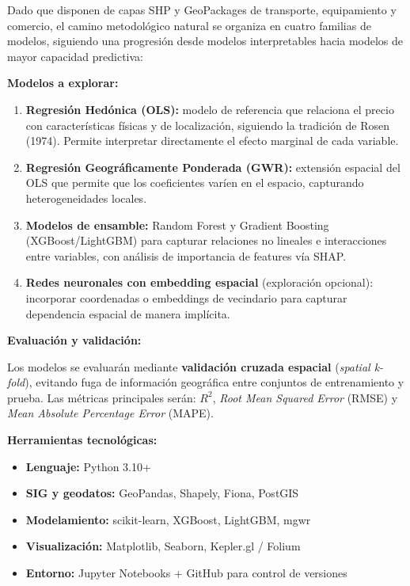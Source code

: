 \documentclass[12pt, letterpaper]{article}
\begin{document}
\begin{aimsg}
Dado que disponen de capas SHP y GeoPackages de transporte, equipamiento y comercio, el camino
metodológico natural se organiza en cuatro familias de modelos, siguiendo una progresión desde
modelos interpretables hacia modelos de mayor capacidad predictiva:

\medskip
\textbf{Modelos a explorar:}

\begin{enumerate}[leftmargin=1.5em, itemsep=0.4em]
  \item \textbf{Regresión Hedónica (OLS):} modelo de referencia que relaciona
        el precio con características físicas y de localización, siguiendo la
        tradición de Rosen (1974). Permite interpretar directamente el efecto
        marginal de cada variable.
  \item \textbf{Regresión Geográficamente Ponderada (GWR):} extensión espacial
        del OLS que permite que los coeficientes varíen en el espacio, capturando
        heterogeneidades locales.
  \item \textbf{Modelos de ensamble:} Random Forest y Gradient Boosting
        (XGBoost/LightGBM) para capturar relaciones no lineales e interacciones
        entre variables, con análisis de importancia de features vía SHAP.
  \item \textbf{Redes neuronales con embedding espacial} (exploración opcional):
        incorporar coordenadas o embeddings de vecindario para capturar dependencia
        espacial de manera implícita.
\end{enumerate}

\medskip
\textbf{Evaluación y validación:}

Los modelos se evaluarán mediante \textbf{validación cruzada espacial}
(\textit{spatial k-fold}), evitando fuga de información geográfica entre
conjuntos de entrenamiento y prueba. Las métricas principales serán:
$R^2$, \textit{Root Mean Squared Error} (RMSE) y \textit{Mean Absolute
Percentage Error} (MAPE).

\medskip
\textbf{Herramientas tecnológicas:}

\begin{itemize}[leftmargin=1.5em, itemsep=0.2em]
  \item \textbf{Lenguaje:} Python 3.10+
  \item \textbf{SIG y geodatos:} GeoPandas, Shapely, Fiona, PostGIS
  \item \textbf{Modelamiento:} scikit-learn, XGBoost, LightGBM, mgwr
  \item \textbf{Visualización:} Matplotlib, Seaborn, Kepler.gl / Folium
  \item \textbf{Entorno:} Jupyter Notebooks + GitHub para control de versiones
\end{itemize}
\end{aimsg}
\end{document}
